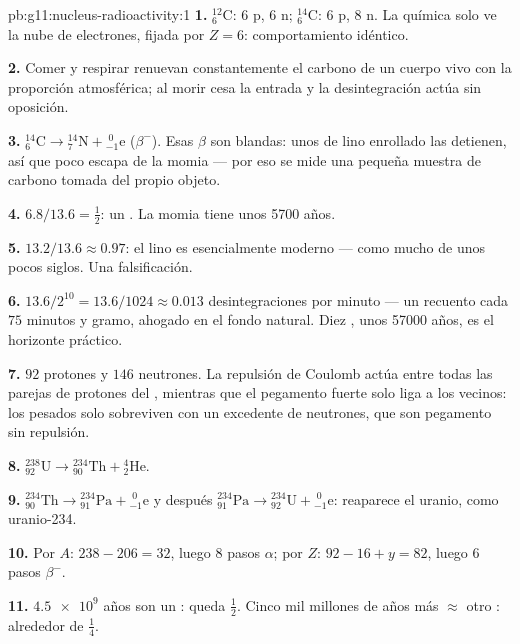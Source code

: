 \begin{solution}{pb:g11:nucleus-radioactivity:1}
\textbf{1.} ${}^{12}_{6}\mathrm{C}$: $6$ p, $6$ n;
${}^{14}_{6}\mathrm{C}$: $6$ p, $8$ n. La química solo ve la nube de
electrones, fijada por $Z = 6$: comportamiento idéntico.

\textbf{2.} Comer y respirar renuevan constantemente el carbono de un
cuerpo vivo con la proporción atmosférica; al morir cesa la entrada y la
desintegración actúa sin oposición.

\textbf{3.} ${}^{14}_{6}\mathrm{C} \to {}^{14}_{7}\mathrm{N} +
{}^{\;0}_{-1}\mathrm{e}$ ($\beta^-$). Esas $\beta$ son blandas: unos
 de lino enrollado las detienen, así que poco escapa de la momia
--- por eso se mide una pequeña muestra de carbono tomada del propio
objeto.

\textbf{4.} $6.8/13.6 = \frac12$: un . La momia tiene unos
\num{5700} años.

\textbf{5.} $13.2/13.6 \approx 0.97$: el lino es esencialmente moderno
--- como mucho de unos pocos siglos. Una falsificación.

\textbf{6.} $13.6/2^{10} = 13.6/1024 \approx 0.013$ desintegraciones por
minuto --- un recuento cada $75$ minutos y gramo, ahogado en el fondo
natural. Diez , unos \num{57000} años, es el horizonte
práctico.

\textbf{7.} $92$ protones y $146$ neutrones. La repulsión de Coulomb
actúa entre todas las parejas de protones del , mientras que el
pegamento fuerte solo liga a los vecinos: los  pesados solo
sobreviven con un excedente de neutrones, que son pegamento sin
repulsión.

\textbf{8.} ${}^{238}_{92}\mathrm{U} \to {}^{234}_{90}\mathrm{Th} +
{}^{4}_{2}\mathrm{He}$.

\textbf{9.} ${}^{234}_{90}\mathrm{Th} \to {}^{234}_{91}\mathrm{Pa} +
{}^{\;0}_{-1}\mathrm{e}$ y después
${}^{234}_{91}\mathrm{Pa} \to {}^{234}_{92}\mathrm{U} +
{}^{\;0}_{-1}\mathrm{e}$: reaparece el uranio, como uranio-234.

\textbf{10.} Por $A$: $238 - 206 = 32$, luego $8$ pasos $\alpha$; por
$Z$: $92 - 16 + y = 82$, luego $6$ pasos $\beta^-$.

\textbf{11.} $\num{4.5e9}$ años son un : queda $\frac12$. Cinco
mil millones de años más $\approx$ otro : alrededor de
$\frac14$.


\end{solution}
